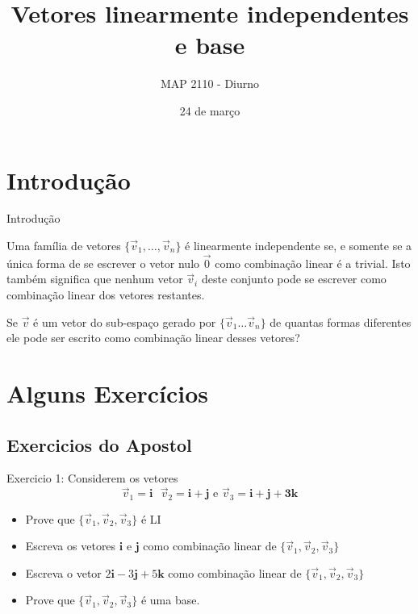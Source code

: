 \documentclass{beamer}
\title[Vetores LI]{Vetores linearmente independentes e base}
\author{MAP 2110 - Diurno}
\institute{IME USP}
\date{24 de março}
\begin{document}
\begin{frame}
  \titlepage
\end{frame}


\section{Introdução}

\begin{frame}{Introdução}

Uma família de vetores $\{ \vec{v}_1, \dots, \vec{v}_n \}$ é linearmente independente se, e somente se a única forma de se escrever o vetor nulo $\vec{0}$ como combinação linear é a trivial.
Isto também significa que nenhum vetor $\vec{v}_i$ deste conjunto pode se escrever como combinação linear dos vetores restantes.

Se $\vec{v}$ é um vetor do sub-espaço gerado por $\{ \vec{v}_1 \dots \vec{v}_n \}$ de quantas formas diferentes ele pode ser escrito como combinação linear desses vetores?

\end{frame}

\section{Alguns Exercícios}

\subsection{Exercicios do Apostol}

\begin{frame}{Exercicio 1:}
Considerem os vetores 
$$ \vec{v}_1=\mathbf{i} \text{  }  \vec{v}_2=\mathbf{i} + \mathbf{j} \text{ e }\vec{v}_3 = \mathbf{i + j + 3k} $$

\begin{itemize}
    \item Prove que $\{ \vec{v}_1,\vec{v}_2,\vec{v}_3\}$ é LI
    \item Escreva os vetores $\mathbf{i}$ e $\mathbf{j}$ como combinação linear de $\{ \vec{v}_1,\vec{v}_2,\vec{v}_3\}$
    \item Escreva o vetor $2\mathbf{i} -3\mathbf{j} + 5\mathbf{k}$ como combinação linear de $\{ \vec{v}_1,\vec{v}_2,\vec{v}_3\}$
    \item Prove que $\{ \vec{v}_1,\vec{v}_2,\vec{v}_3\}$ é uma base.
\end{itemize}

\end{frame}
\end{document}
